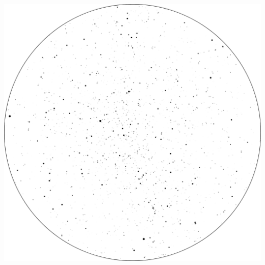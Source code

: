 \documentclass{SAS-class-skygen}
\begin{document}
	\vspace{0.5cm}
    \begin{center}
    \includegraphics[width=\textwidth]{./pics/sky_chart18.png}
    \end{center}
    
    
\end{document}
